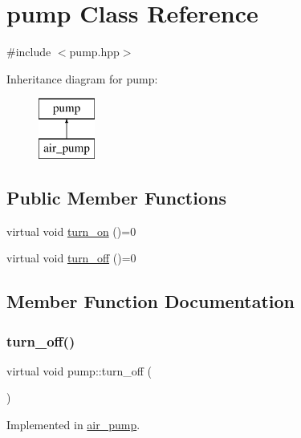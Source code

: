 \hypertarget{classpump}{}\section{pump Class Reference}
\label{classpump}


{\ttfamily \#include $<$pump.\+hpp$>$}

Inheritance diagram for pump\+:\begin{figure}[H]
\begin{center}
\leavevmode
\includegraphics[height=2.000000cm]{classpump}
\end{center}
\end{figure}
\subsection*{Public Member Functions}
\begin{DoxyCompactItemize}
\item 
virtual void \hyperlink{classpump_a2c0ed32be49cad297b49ec2c97403a2c}{turn\+\_\+on} ()=0
\item 
virtual void \hyperlink{classpump_a62d85abfd2f7c79b78bca51af80a909d}{turn\+\_\+off} ()=0
\end{DoxyCompactItemize}


\subsection{Member Function Documentation}
\mbox{\label{classpump_a62d85abfd2f7c79b78bca51af80a909d}} 
\subsubsection{\texorpdfstring{turn\+\_\+off()}{turn\_off()}}
{\footnotesize\ttfamily virtual void pump\+::turn\+\_\+off (\begin{DoxyParamCaption}{ }\end{DoxyParamCaption})\hspace{0.3cm}{\ttfamily [pure virtual]}}



Implemented in \hyperlink{classair__pump_a9162180a77749f04ae735debb3f36bf9}{air\+\_\+pump}.


